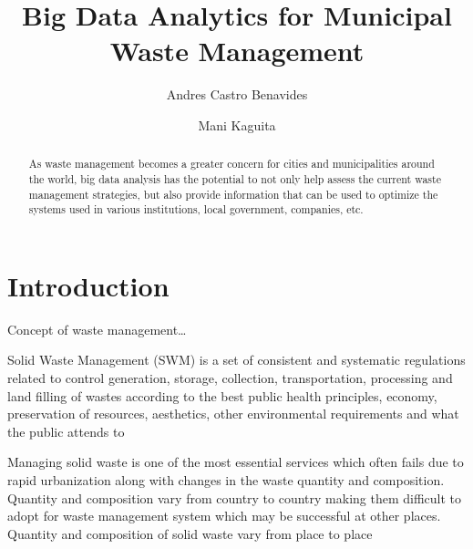 \documentclass[sigconf]{acmart}
\begin{document}
\title{Big Data Analytics for Municipal Waste Management}

\author{Andres Castro Benavides}

\author{Mani Kaguita}


\renewcommand{\shortauthors}{B. Trovato et al.}


\begin{abstract}
As waste management becomes a greater concern for cities and municipalities around the world, big data analysis has the potential to not only help assess the current waste management strategies, but also provide information that can be used to optimize the systems used in various institutions, local government, companies, etc.

\end{abstract}




\maketitle

\section{Introduction}

Concept of waste management…

Solid Waste Management (SWM) is a set of consistent and systematic regulations related to control generation, storage, collection, transportation, processing and land filling of wastes according to the best public health principles, economy, preservation of resources, aesthetics, other environmental requirements and what the public attends to ~\cite{akbarpour2016}

Managing solid waste is one of the most essential services which often fails due to
rapid urbanization along with changes in the waste quantity and composition.
Quantity and composition vary from country to country making them difficult to
adopt for waste management system which may be successful at other places.
Quantity and composition of solid waste vary from place to place ~\cite{chandrappa2012} 
\end{document}
